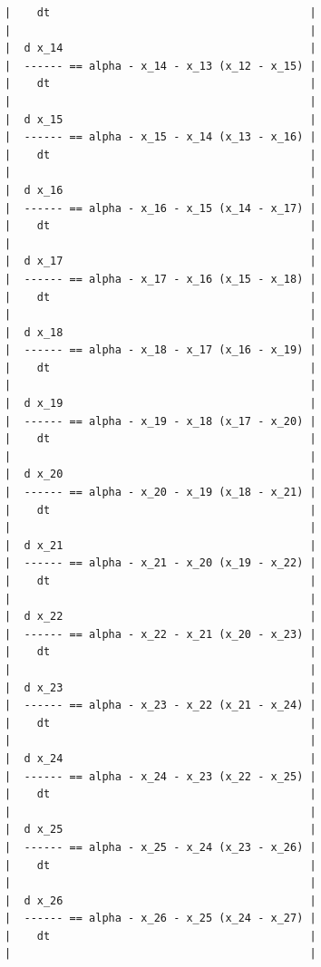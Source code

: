 {\begin{verbatim}
|    dt                                        |
|                                              |
|  d x_14                                      |
|  ------ == alpha - x_14 - x_13 (x_12 - x_15) |
|    dt                                        |
|                                              |
|  d x_15                                      |
|  ------ == alpha - x_15 - x_14 (x_13 - x_16) |
|    dt                                        |
|                                              |
|  d x_16                                      |
|  ------ == alpha - x_16 - x_15 (x_14 - x_17) |
|    dt                                        |
|                                              |
|  d x_17                                      |
|  ------ == alpha - x_17 - x_16 (x_15 - x_18) |
|    dt                                        |
|                                              |
|  d x_18                                      |
|  ------ == alpha - x_18 - x_17 (x_16 - x_19) |
|    dt                                        |
|                                              |
|  d x_19                                      |
|  ------ == alpha - x_19 - x_18 (x_17 - x_20) |
|    dt                                        |
|                                              |
|  d x_20                                      |
|  ------ == alpha - x_20 - x_19 (x_18 - x_21) |
|    dt                                        |
|                                              |
|  d x_21                                      |
|  ------ == alpha - x_21 - x_20 (x_19 - x_22) |
|    dt                                        |
|                                              |
|  d x_22                                      |
|  ------ == alpha - x_22 - x_21 (x_20 - x_23) |
|    dt                                        |
|                                              |
|  d x_23                                      |
|  ------ == alpha - x_23 - x_22 (x_21 - x_24) |
|    dt                                        |
|                                              |
|  d x_24                                      |
|  ------ == alpha - x_24 - x_23 (x_22 - x_25) |
|    dt                                        |
|                                              |
|  d x_25                                      |
|  ------ == alpha - x_25 - x_24 (x_23 - x_26) |
|    dt                                        |
|                                              |
|  d x_26                                      |
|  ------ == alpha - x_26 - x_25 (x_24 - x_27) |
|    dt                                        |
|                                              |

\end{verbatim}}
